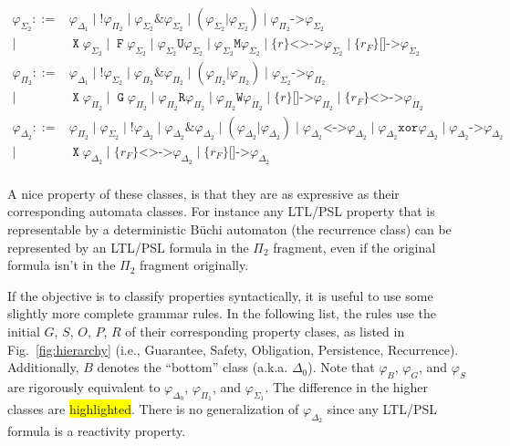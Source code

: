 \documentclass[a4paper,twoside,10pt,DIV=12]{scrreprt}
\DeclareMathOperator{\F}{\texttt{F}}
\DeclareMathOperator{\G}{\texttt{G}}
\newcommand{\U}{\mathbin{\texttt{U}}}
\newcommand{\R}{\mathbin{\texttt{R}}}
\DeclareMathOperator{\X}{\texttt{X}}
\newcommand{\M}{\mathbin{\texttt{M}}}
\newcommand{\W}{\mathbin{\texttt{W}}}
\DeclareMathOperator{\NOT}{\texttt{!}}
\newcommand{\XOR}{\mathbin{\texttt{xor}}}
\newcommand{\IMPLIES}{\mathbin{\texttt{->}}}
\newcommand{\EQUIV}{\mathbin{\texttt{<->}}}
\newcommand{\OR}{\mathbin{\texttt{|}}}
\newcommand{\AND}{\mathbin{\texttt{\&}}}
\newcommand{\0}{\texttt{0}}
\newcommand{\1}{\texttt{1}}
\newcommand{\Esuffix}{\texttt{<>->}}
\newcommand{\Asuffix}{\texttt{[]->}}
\newcommand{\sere}[1]{\texttt{\{}#1\texttt{\}}}
\begin{document}
\begin{align*}
  \varphi_{\Sigma_2} ::={}& \varphi_{\Delta_1} \mid \NOT\varphi_{\Pi_2}\mid
                   \varphi_{\Sigma_2}\AND \varphi_{\Sigma_2}\mid (\varphi_{\Sigma_2}\OR \varphi_{\Sigma_2})\mid
                   \varphi_{\Pi_2}\IMPLIES \varphi_{\Sigma_2}\\
           \mid{}& \X\varphi_{\Sigma_2} \mid \F\varphi_{\Sigma_2} \mid
                   \varphi_{\Sigma_2}\U\varphi_{\Sigma_2}\mid\varphi_{\Sigma_2}\M\varphi_{\Sigma_2}
                   \mid{} \sere{r}\Esuffix \varphi_{\Sigma_2}\mid \sere{r_F}\Asuffix \varphi_{\Sigma_2}\\
  \varphi_{\Pi_2} ::={}& \varphi_{\Delta_1} \mid \NOT\varphi_{\Sigma_2}\mid
                   \varphi_{\Pi_2}\AND \varphi_{\Pi_2}\mid (\varphi_{\Pi_2}\OR \varphi_{\Pi_2})\mid
                   \varphi_{\Sigma_2}\IMPLIES \varphi_{\Pi_2}\\
           \mid{}& \X\varphi_{\Pi_2} \mid \G\varphi_{\Pi_2} \mid
                   \varphi_{\Pi_2}\R\varphi_{\Pi_2}\mid
                   \varphi_{\Pi_2}\W\varphi_{\Pi_2} \mid{} \sere{r}\Asuffix \varphi_{\Pi_2}\mid \sere{r_F}\Esuffix \varphi_{\Pi_2}\\
  \varphi_{\Delta_2} ::={}& \varphi_{\Pi_2} \mid \varphi_{\Sigma_2}\mid \NOT\varphi_{\Delta_2}\mid
                   \varphi_{\Delta_2}\AND \varphi_{\Delta_2}\mid (\varphi_{\Delta_2}\OR \varphi_{\Delta_2})\mid
                   \varphi_{\Delta_2}\EQUIV \varphi_{\Delta_2}\mid \varphi_{\Delta_2}\XOR \varphi_{\Delta_2}\mid
                   \varphi_{\Delta_2}\IMPLIES \varphi_{\Delta_2}\\
           \mid{}& \X\varphi_{\Delta_2} \mid{} \sere{r_F}\Esuffix \varphi_{\Delta_2} \mid
                   \sere{r_F}\Asuffix \varphi_{\Delta_2}\\
\end{align*}


A nice property of these classes, is that they are as expressive as
their corresponding automata classes.  For instance any LTL/PSL
property that is representable by a deterministic Büchi automaton (the
recurrence class) can be represented by an LTL/PSL formula in the
$\Pi_2$ fragment, even if the original formula isn't in the $\Pi_2$
fragment originally.

If the objective is to classify properties syntactically, it is useful
to use some slightly more complete grammar rules.  In the following
list, the rules use the initial $G$, $S$, $O$, $P$, $R$ of their
corresponding property clases, as listed in Fig.~\ref{fig:hierarchy}
(i.e., Guarantee, Safety, Obligation, Persistence, Recurrence).
Additionally, $B$ denotes the ``bottom'' class (a.k.a. $\Delta_0$).
Note that $\varphi_B$, $\varphi_G$, and $\varphi_S$ are rigorously
equivalent to $\varphi_{\Delta_0}$, $\varphi_{\Pi_1}$, and
$\varphi_{\Sigma_1}$.  The difference in the higher classes are
\colorbox{yellow}{highlighted}.  There is no generalization of
$\varphi_{\Delta_2}$ since any LTL/PSL formula is a reactivity
property.
\end{document}
